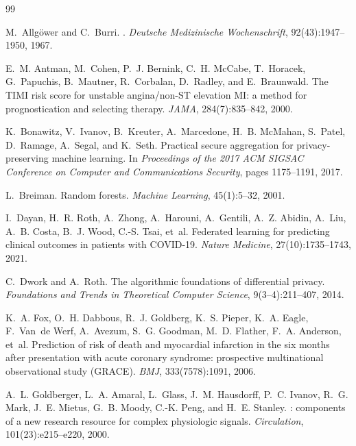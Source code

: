 \begin{thebibliography}{99}

M.~Allg{\"o}wer and C.~Burri.
.
\newblock \emph{Deutsche Medizinische Wochenschrift}, 92(43):1947--1950, 1967.

E.~M. Antman, M.~Cohen, P.~J. Bernink, C.~H. McCabe, T.~Horacek, G.~Papuchis,
  B.~Mautner, R.~Corbalan, D.~Radley, and E.~Braunwald.
\newblock The {TIMI} risk score for unstable angina/non-{ST} elevation {MI}: a
  method for prognostication and selecting therapy.
\newblock \emph{JAMA}, 284(7):835--842, 2000.

K.~Bonawitz, V.~Ivanov, B.~Kreuter, A.~Marcedone, H.~B. McMahan, S.~Patel,
  D.~Ramage, A.~Segal, and K.~Seth.
\newblock Practical secure aggregation for privacy-preserving machine learning.
\newblock In \emph{Proceedings of the 2017 ACM SIGSAC Conference on Computer
  and Communications Security}, pages 1175--1191, 2017.

L.~Breiman.
\newblock Random forests.
\newblock \emph{Machine Learning}, 45(1):5--32, 2001.

I.~Dayan, H.~R. Roth, A.~Zhong, A.~Harouni, A.~Gentili, A.~Z. Abidin, A.~Liu,
  A.~B. Costa, B.~J. Wood, C.-S. Tsai, et~al.
\newblock Federated learning for predicting clinical outcomes in patients with
  {COVID-19}.
\newblock \emph{Nature Medicine}, 27(10):1735--1743, 2021.

C.~Dwork and A.~Roth.
\newblock The algorithmic foundations of differential privacy.
\newblock \emph{Foundations and Trends{\textregistered} in Theoretical
  Computer Science}, 9(3--4):211--407, 2014.

K.~A. Fox, O.~H. Dabbous, R.~J. Goldberg, K.~S. Pieper, K.~A. Eagle, F.~Van~de
  Werf, A.~Avezum, S.~G. Goodman, M.~D. Flather, F.~A. Anderson, et~al.
\newblock Prediction of risk of death and myocardial infarction in the six
  months after presentation with acute coronary syndrome: prospective
  multinational observational study ({GRACE}).
\newblock \emph{BMJ}, 333(7578):1091, 2006.

A.~L. Goldberger, L.~A. Amaral, L.~Glass, J.~M. Hausdorff, P.~C. Ivanov, R.~G.
  Mark, J.~E. Mietus, G.~B. Moody, C.-K. Peng, and H.~E. Stanley.
: components of a new
  research resource for complex physiologic signals.
\newblock \emph{Circulation}, 101(23):e215--e220, 2000.


\end{thebibliography}
